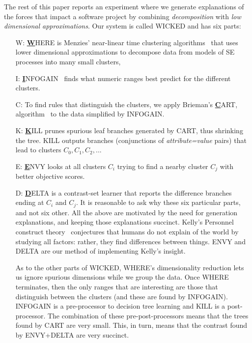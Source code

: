 The rest of this paper reports an experiment where we generate explanations
of the forces that impact a software project by combining
{\em decomposition} with {\em low dimensional approximations}. Our
system is called WICKED and has six parts:
\begin{itemize}
\item[W:]
\underline{{\bf W}}HERE is Menzies'  near-linear time clustering algorithms~\cite{me12d}  that uses lower dimensional approximations
to
decompose
data from models of SE processes into many small clusters,
\item [I:] \underline{{\bf I}}NFOGAIN~\cite{FayIra93Multi} 
finds what numeric ranges best predict for the different clusters.
\item[C:] To find rules that distinguish the clusters,
we apply Brieman's \underline{{\bf C}}ART,
algorithm~\cite{breiman84} to the data simplified by INFOGAIN.
\item[K:]
\underline{{\bf K}}ILL  prunes spurious leaf
branches generated by CART, thus shrinking the tree.
KILL outputs branches (conjunctions of {\em attribute=value} pairs)
that lead to clusters $C_0,C_1,C_2,..$.
\item[E:]
\underline{{\bf E}}NVY looks at  all clusters $C_i$ trying to find a nearby cluster $C_j$  
with better objective scores.
\item[D:] \underline{{\bf D}}ELTA is a contrast-set
  learner that reports the difference branches
  ending at $C_i$ and $C_j$.  \ei It is reasonable
  to ask why these six particular parts, and not six
  other.  All the above are motivated by the need
  for generation explanations, and keeping those
  explanations succinct.  Kelly's Personnel
  construct theory~\cite{kelly55} conjectures that
  humans do not explain of the world by studying all
  factors: rather, they find differences between
  things. ENVY and DELTA are our method of
  implementing Kelly's insight.

As to the other parts of WICKED, WHERE's
dimensionality reduction lets us ignore spurious
dimensions while we group the data. Once WHERE
terminates, then the only ranges that are
interesting are those that distinguish between the
clusters (and these are found by INFOGAIN).
INFOGAIN is a pre-processor to decision tree
learning and KILL is a post-processor.  The
combination of these pre-post-processors means that
the trees found by CART are very small. This, in
turn, means that the contrast found by ENVY+DELTA
are very succinct.


\end{itemize}
